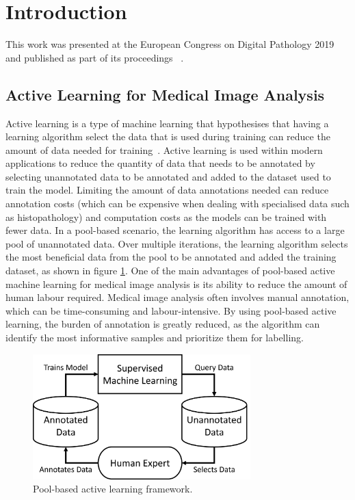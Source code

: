 \section{Introduction}
\label{sec:active_introduction}
This work was presented at the European Congress on Digital Pathology 2019 and published as part of its proceedings ~\citep{carse2019active}.

\subsection{Active Learning for Medical Image Analysis}
\label{subsec:active_for_medical_image_analysis}
Active learning is a type of machine learning that hypothesises that having a learning algorithm select the data that is used during training can reduce the amount of data needed for training~\citep{settles2012active}. Active learning is used within modern applications to reduce the quantity of data that needs to be annotated by selecting unannotated data to be annotated and added to the dataset used to train the model. Limiting the amount of data annotations needed can reduce annotation costs (which can be expensive when dealing with specialised data such as histopathology) and computation costs as the models can be trained with fewer data. In a pool-based scenario, the learning algorithm has access to a large pool of unannotated data. Over multiple iterations, the learning algorithm selects the most beneficial data from the pool to be annotated and added the training dataset, as shown in figure \ref{fig:pool_based_active_learning}. One of the main advantages of pool-based active machine learning for medical image analysis is its ability to reduce the amount of human labour required. Medical image analysis often involves manual annotation, which can be time-consuming and labour-intensive. By using pool-based active learning, the burden of annotation is greatly reduced, as the algorithm can identify the most informative samples and prioritize them for labelling.

\begin{figure}[h]
	\centering
	\includegraphics[width=0.75\textwidth]{images/active_learning.png}
	\caption{Pool-based active learning framework.}
	\label{fig:pool_based_active_learning}
\end{figure}


